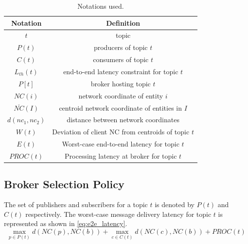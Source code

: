 \begin{table}[t]
	\center
		\begin{tabular}{ |c|c| } 
			\hline
			\textbf{Notation} & \textbf{Definition}\\ 
			\hline
			$t$ & topic\\
			$P\left( t \right)$ & producers of topic $t$\\
			$C\left( t \right)$ & consumers of topic $t$\\
			$L_{th}\left( t \right)$ & end-to-end latency constraint for topic $t$\\
			$P\left[ t \right]$ & broker hosting topic $t$\\
			$NC\left( i \right)$ & network coordinate of entity $i$\\
			$\overline{NC}\left( I \right)$ & centroid network coordinate of entities in $I$\\
			$d\left( nc_1, nc_2 \right)$ & distance between network coordinates\\
			$W\left( t \right)$ & Deviation of client NC from centroids of topic $t$\\
			$E\left( t \right)$ & Worst-case end-to-end latency for topic $t$\\
			$PROC \left( t \right)$ & Processing latency at broker for topic $t$\\
			\hline
		\end{tabular}
	\caption{Notations used.}\label{table:notations}
\end{table}

\subsection{Broker Selection Policy}
The set of publishers and subscribers for a topic $t$ is denoted by $P \left( t \right)$ and $C \left( t \right)$ respectively. The worst-case message delivery latency for topic $t$ is represented as shown in \cref{eq:e2e_latency}.
\begin{equation}
\max\limits_{p \in P\left( t \right)} d \left( NC \left( p\right), NC \left( b\right) \right) + \max\limits_{c \in C\left( t \right)} d \left( NC \left( c\right), NC \left( b\right)\right) + PROC \left( t \right)
\label{eq:e2e_latency}
\end{equation}


